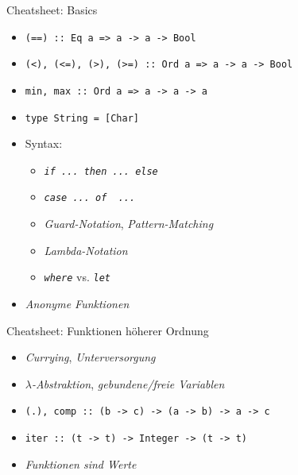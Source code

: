 \documentclass{beamer}
\begin{document}
\begin{frame}{Cheatsheet: Basics}
        \begin{itemize}
          \item \texttt{(==) :: Eq a => a -> a -> Bool}
          \item \texttt{(<), (<=), (>), (>=) :: Ord a => a -> a -> Bool}
          \item \texttt{min, max :: Ord a => a -> a -> a}
          \item \texttt{type String = [Char]}
          \item Syntax:
          \begin{itemize}
            \item \emph{\texttt{if ... then ... else}}
            \item \emph{\texttt{case ... of { ... }}}
            \item \emph{Guard-Notation}, \emph{Pattern-Matching}
            \item \emph{Lambda-Notation}
            \item \emph{\texttt{where}} vs. \emph{\texttt{let}}
          \end{itemize}
          \item \emph{Anonyme Funktionen}
        \end{itemize}
\end{frame}

\begin{frame}{Cheatsheet: Funktionen höherer Ordnung}
        \begin{itemize}
          \item \emph{Currying}, \emph{Unterversorgung}
          \item \emph{$\lambda$-Abstraktion}, \emph{gebundene/freie Variablen}
          \item \texttt{(.), comp :: (b -> c) -> (a -> b) -> a -> c}
          \item \texttt{iter :: (t -> t) -> Integer -> (t -> t)}
          \item \emph{Funktionen sind Werte}
        \end{itemize}
\end{frame}
\end{document}
